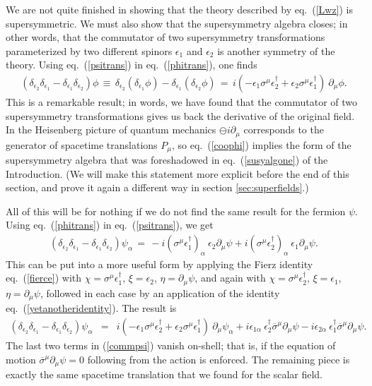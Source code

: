 \documentclass[11pt]{article}
\def\BDpos{}
\def\BDpos{-}
\def\BDpos{\oplus}
\def\BDpos{\ominus}
\def\beq{\begin{eqnarray}}
\def\eeq{\end{eqnarray}}
\def\sigmabar{\overline\sigma}
\begin{document}
We are not quite finished in showing that the theory described by
eq.~(\ref{Lwz}) is supersymmetric. We must also show that the
supersymmetry algebra closes; in other words, that the commutator of two
supersymmetry transformations parameterized by two different spinors
$\epsilon_1$ and $\epsilon_2$ is another symmetry of the theory. Using
eq.~(\ref{psitrans}) in eq.~(\ref{phitrans}), one finds
\beq
(\delta_{\epsilon_2} \delta_{\epsilon_1} -
\delta_{\epsilon_1} \delta_{\epsilon_2}) \phi 
\,\equiv\,
\delta_{\epsilon_2} (\delta_{\epsilon_1} \phi) -
\delta_{\epsilon_1} (\delta_{\epsilon_2} \phi) 
\,=\,
i (- \epsilon_1 \sigma^\mu \epsilon_2^\dagger 
   + \epsilon_2 \sigma^\mu \epsilon_1^\dagger)\> \partial_\mu \phi
. \label{coophi}
\eeq
This is a remarkable result; in words, we have found that the commutator
of two supersymmetry transformations gives us back the derivative of the
original field. In the Heisenberg picture of quantum mechanics
$\BDpos i\partial_\mu$ corresponds to the generator of
spacetime translations $P_\mu$, so eq.~(\ref{coophi}) implies the form of the
supersymmetry algebra that was foreshadowed in eq.~(\ref{susyalgone}) of
the Introduction. (We will make this statement more explicit before the
end of this section, and prove it again a different way in section \ref{sec:superfields}.)

All of this will be for nothing if we do not find the same result for the
fermion $\psi$. Using eq.~(\ref{phitrans}) in eq.~(\ref{psitrans}), we get
\beq
(\delta_{\epsilon_2} \delta_{\epsilon_1} -
\delta_{\epsilon_1} \delta_{\epsilon_2}) \psi_\alpha 
\,=\,
-i(\sigma^\mu\epsilon_1^\dagger)_\alpha\>  \epsilon_2 \partial_\mu\psi  
+i(\sigma^\mu\epsilon_2^\dagger)_\alpha \> \epsilon_1 \partial_\mu\psi
{}.
\eeq
This can be put into a more useful form by applying the Fierz identity
eq.~(\ref{fierce})
with $\chi = \sigma^\mu \epsilon_1^\dagger$,
$\xi = \epsilon_{2} $, $\eta = \partial_\mu \psi$, and again with
$\chi = \sigma^\mu \epsilon_2^\dagger$,
$\xi = \epsilon_{1} $, $\eta = \partial_\mu \psi$, followed
in each case by an application
of the identity eq.~(\ref{yetanotheridentity}). The result is
\beq
(\delta_{\epsilon_2} \delta_{\epsilon_1} -
\delta_{\epsilon_1} \delta_{\epsilon_2}) \psi_\alpha 
& = &
 i (-\epsilon_1 \sigma^\mu \epsilon_2^\dagger 
    +\epsilon_2 \sigma^\mu \epsilon_1^\dagger) \> \partial_\mu \psi_\alpha
+ i \epsilon_{1\alpha} \> \epsilon_2^\dagger \sigmabar^\mu \partial_\mu\psi
- i \epsilon_{2\alpha} \> \epsilon_1^\dagger \sigmabar^\mu 
\partial_\mu\psi
{}.\phantom{xxxxx}
\label{commpsi}
\eeq
The last two terms in (\ref{commpsi}) vanish on-shell; that is, if the
equation of motion $\sigmabar^\mu\partial_\mu \psi = 0$ following from the
action is enforced. The remaining piece is exactly the same spacetime
translation that we found for the scalar field.
\end{document}
